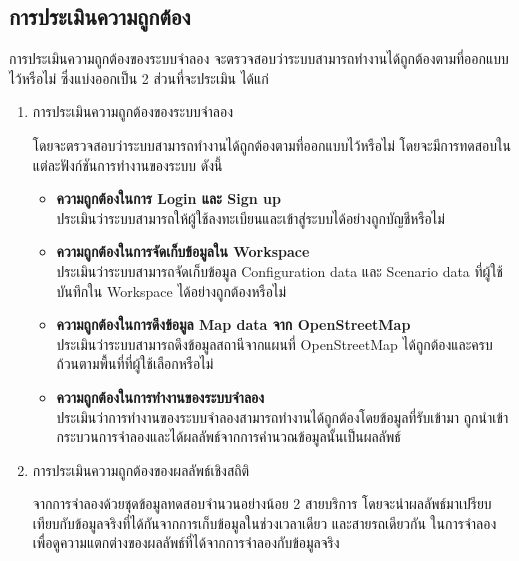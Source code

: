 \subsection{การประเมินความถูกต้อง}
\begin{mypara}
    \indent การประเมินความถูกต้องของระบบจำลอง จะตรวจสอบว่าระบบสามารถทำงานได้ถูกต้องตามที่ออกแบบไว้หรือไม่
    ซึ่งแบ่งออกเป็น 2 ส่วนที่จะประเมิน ได้แก่
\end{mypara}
    \begin{enumerate}
        \item การประเมินความถูกต้องของระบบจำลอง
            \begin{mypara}
                \indent โดยจะตรวจสอบว่าระบบสามารถทำงานได้ถูกต้องตามที่ออกแบบไว้หรือไม่ โดยจะมีการทดสอบในแต่ละฟังก์ชันการทำงานของระบบ
                ดังนี้
            \end{mypara}
                \begin{itemize}
                    \item \textbf{ความถูกต้องในการ Login และ Sign up}
                        \\ ประเมินว่าระบบสามารถให้ผู้ใช้ลงทะเบียนและเข้าสู่ระบบได้อย่างถูกบัญชีหรือไม่
                    \item \textbf{ความถูกต้องในการจัดเก็บข้อมูลใน Workspace}
                        \\ ประเมินว่าระบบสามารถจัดเก็บข้อมูล Configuration data และ Scenario data ที่ผู้ใช้บันทึกใน Workspace ได้อย่างถูกต้องหรือไม่ 
                    \item \textbf{ความถูกต้องในการดึงข้อมูล Map data จาก OpenStreetMap}
                        \\ ประเมินว่าระบบสามารถดึงข้อมูลสถานีจากแผนที่ OpenStreetMap ได้ถูกต้องและครบถ้วนตามพื้นที่ที่ผู้ใช้เลือกหรือไม่
                    \item \textbf{ความถูกต้องในการทำงานของระบบจำลอง}
                        \\ ประเมินว่าการทำงานของระบบจำลองสามารถทำงานได้ถูกต้องโดยข้อมูลที่รับเข้ามา
                        ถูกนำเข้ากระบวนการจำลองและได้ผลลัพธ์จากการคำนวณข้อมูลนั้นเป็นผลลัพธ์
                \end{itemize}
        \item การประเมินความถูกต้องของผลลัพธ์เชิงสถิติ
            \begin{mypara}
                \indent จากการจำลองด้วยชุดข้อมูลทดสอบจำนวนอย่างน้อย 2 สายบริการ 
                โดยจะนำผลลัพธ์มาเปรียบเทียบกับข้อมูลจริงที่ได้กันจากการเก็บข้อมูลในช่วงเวลาเดียว
                และสายรถเดียวกัน ในการจำลองเพื่อดูความแตกต่างของผลลัพธ์ที่ได้จากการจำลองกับข้อมูลจริง \\

\end{mypara}
\end{enumerate}
